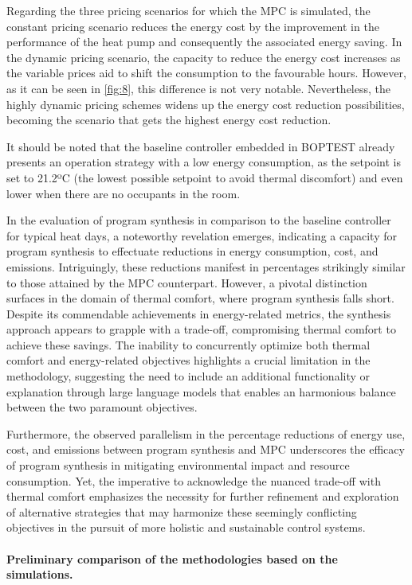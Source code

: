 Regarding the three pricing scenarios for which the MPC is simulated, the constant pricing scenario reduces the energy cost by the improvement in the performance of the heat pump and consequently the associated energy saving. In the dynamic pricing scenario, the capacity to reduce the energy cost increases as the variable prices aid to shift the consumption to the favourable hours. However, as it can be seen in \ref{fig:8}, this difference is not very notable. Nevertheless, the highly dynamic pricing schemes widens up the energy cost reduction possibilities, becoming the scenario that gets the highest energy cost reduction.

It should be noted that the baseline controller embedded in BOPTEST already presents an operation strategy with a low energy consumption, as the setpoint is set to 21.2ºC (the lowest possible setpoint to avoid thermal discomfort) and even lower when there are no occupants in the room.

In the evaluation of program synthesis in comparison to the baseline controller for typical heat days, a noteworthy revelation emerges, indicating a capacity for program synthesis to effectuate reductions in energy consumption, cost, and emissions. Intriguingly, these reductions manifest in percentages strikingly similar to those attained by the MPC counterpart. However, a pivotal distinction surfaces in the domain of thermal comfort, where program synthesis falls short. Despite its commendable achievements in energy-related metrics, the synthesis approach appears to grapple with a trade-off, compromising thermal comfort to achieve these savings. The inability to concurrently optimize both thermal comfort and energy-related objectives highlights a crucial limitation in the methodology, suggesting the need to include an additional functionality or explanation through large language models that enables an harmonious balance between the two paramount objectives.

Furthermore, the observed parallelism in the percentage reductions of energy use, cost, and emissions between program synthesis and MPC underscores the efficacy of program synthesis in mitigating environmental impact and resource consumption. Yet, the imperative to acknowledge the nuanced trade-off with thermal comfort emphasizes the necessity for further refinement and exploration of alternative strategies that may harmonize these seemingly conflicting objectives in the pursuit of more holistic and sustainable control systems.

\paragraph{Preliminary comparison of the methodologies based on the simulations.}

